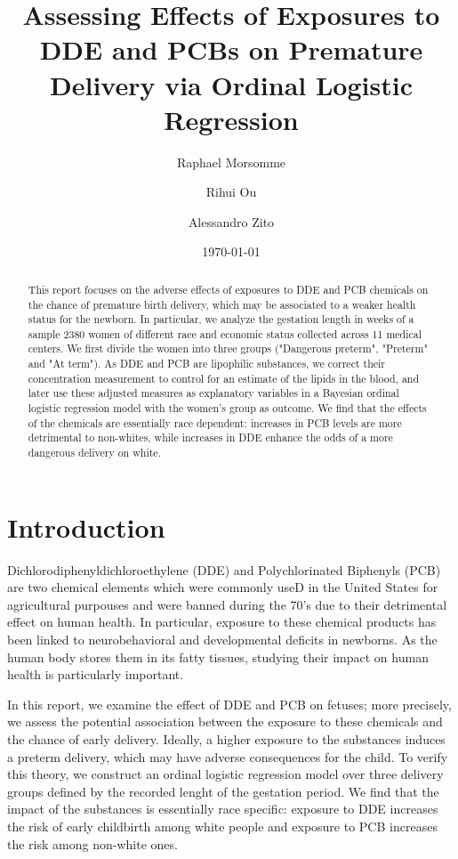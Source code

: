 \documentclass[10pt]{jmlr}%
\title[DDE and PCB effect on Premature delivery]{Assessing Effects of Exposures to DDE and PCBs on Premature Delivery via Ordinal Logistic Regression}	%
\author[Morsomme, Ou, Zito]{Raphael Morsomme \and Rihui Ou \and Alessandro Zito}
\date{\today} %
\begin{document}
\maketitle

\begin{abstract}
This report focuses on the adverse effects of exposures to DDE and PCB chemicals on the chance of premature birth delivery, which may be associated to a weaker health status for the newborn. In particular, we analyze the gestation length in weeks of a sample 2380 women of different race and economic status collected across 11 medical centers. We first divide the women into three groups ("Dangerous preterm", "Preterm" and "At term").  As DDE and PCB are lipophilic substances, we correct their concentration measurement to control for an estimate of the lipids in the blood, and later use these adjusted measures as explanatory variables in a Bayesian ordinal logistic regression model with the women's group as outcome. We find that the effects of the chemicals are essentially race dependent: increases in PCB levels are more detrimental to non-whites, while increases in DDE enhance the odds of a more dangerous delivery on white. 
\end{abstract}
\newpage
\section{Introduction}
\label{sec:intro}

Dichlorodiphenyldichloroethylene (DDE) and Polychlorinated Biphenyls (PCB) are two chemical elements which were commonly useD in the United States for agricultural purpouses and were banned during the 70's due to their detrimental effect on human health. In particular, exposure to these chemical products has been linked to neurobehavioral and developmental deficits in newborns. As the human body stores them in its fatty tissues, studying their impact on human health is particularly important.

In this report, we examine the effect of DDE and PCB on fetuses; more precisely, we assess the potential association between the exposure to these chemicals and the chance of early delivery. Ideally, a higher exposure to the substances induces a preterm delivery, which may have adverse consequences for the child. To verify this theory, we construct an ordinal logistic regression model over three delivery groups defined by the recorded lenght of the gestation period.  We find that the impact of the substances is essentially race specific: exposure to DDE increases the risk of early childbirth among white people and exposure to PCB increases the risk among non-white ones. 
\end{document}
